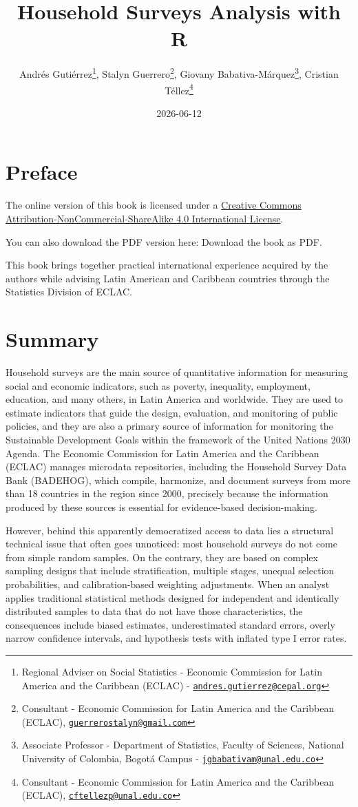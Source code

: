 \documentclass[
  english,
  12pt,
]{book}
\title{Household Surveys Analysis with R}
\author{Andrés Gutiérrez\footnote{Regional Adviser on Social Statistics - Economic Commission for Latin America and the Caribbean (ECLAC) - \href{mailto:andres.gutierrez@cepal.org}{\nolinkurl{andres.gutierrez@cepal.org}}}, Stalyn Guerrero\footnote{Consultant - Economic Commission for Latin America and the Caribbean (ECLAC), \href{mailto:guerrerostalyn@gmail.com}{\nolinkurl{guerrerostalyn@gmail.com}}}, Giovany Babativa-Márquez\footnote{Associate Professor - Department of Statistics, Faculty of Sciences, National University of Colombia, Bogotá Campus - \href{mailto:jgbabativam@unal.edu.co}{\nolinkurl{jgbabativam@unal.edu.co}}}, Cristian Téllez\footnote{Consultant - Economic Commission for Latin America and the Caribbean (ECLAC), \href{mailto:cftellezp@unal.edu.co}{\nolinkurl{cftellezp@unal.edu.co}}}}
\date{2026-06-12}
\begin{document}
\maketitle

\renewcommand*\contentsname{Table of Contents}
{
\hypersetup{linkcolor=}
\setcounter{tocdepth}{1}
\tableofcontents
}
\listoffigures
\listoftables
\chapter*{Preface}\label{preface}

The online version of this book is licensed under a \href{http://creativecommons.org/licenses/by-nc-sa/4.0/}{Creative Commons Attribution-NonCommercial-ShareAlike 4.0 International License}.

You can also download the PDF version here:
Download the book as PDF.

This book brings together practical international experience acquired by the authors while advising Latin American and Caribbean countries through the Statistics Division of ECLAC.

\chapter*{Summary}\label{summary}

Household surveys are the main source of quantitative information for measuring social and economic indicators, such as poverty, inequality, employment, education, and many others, in Latin America and worldwide. They are used to estimate indicators that guide the design, evaluation, and monitoring of public policies, and they are also a primary source of information for monitoring the Sustainable Development Goals within the framework of the United Nations 2030 Agenda. The Economic Commission for Latin America and the Caribbean (ECLAC) manages microdata repositories, including the Household Survey Data Bank (BADEHOG), which compile, harmonize, and document surveys from more than 18 countries in the region since 2000, precisely because the information produced by these sources is essential for evidence-based decision-making.

However, behind this apparently democratized access to data lies a structural technical issue that often goes unnoticed: most household surveys do not come from simple random samples. On the contrary, they are based on complex sampling designs that include stratification, multiple stages, unequal selection probabilities, and calibration-based weighting adjustments. When an analyst applies traditional statistical methods designed for independent and identically distributed samples to data that do not have those characteristics, the consequences include biased estimates, underestimated standard errors, overly narrow confidence intervals, and hypothesis tests with inflated type I error rates.
\end{document}
